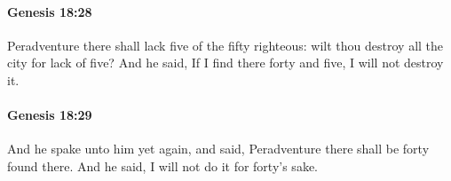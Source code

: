 		\paragraph{Genesis 18:28} %
			\label{GENESIS-18-28}

			Peradventure there shall lack five of the fifty righteous: wilt thou destroy all the city for lack of five? And he said, If I find there forty and five, I will not destroy it.


		\paragraph{Genesis 18:29} %
			\label{GENESIS-18-29}

			And he spake unto him yet again, and said, Peradventure there shall be forty found there. And he said, I will not do it for forty's sake.


